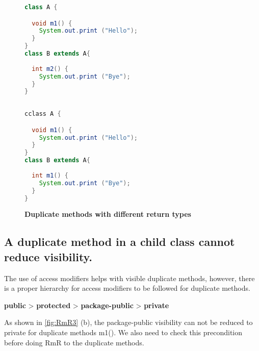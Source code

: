 \begin{figure}[th]
\centering
\begin{minipage}[t]{0.7\linewidth}
\begin{lstlisting}[language=java, basicstyle=\scriptsize\ttfamily,frame=single]
class A {

  void m1() {
    System.out.print ("Hello");
  }
}
class B extends A{
 
  int m2() {
    System.out.print ("Bye");
  }	
}
 
\end{lstlisting}
\end{minipage}
\hfill
\begin{minipage}[t]{0.7\linewidth}
\begin{lstlisting}[language=java, basicstyle=\scriptsize\ttfamily,frame=single]
cclass A {

  void m1() {
    System.out.print ("Hello");
  }
}
class B extends A{
 
  int m1() {
    System.out.print ("Bye");
  }	
}

\end{lstlisting}
\end{minipage}
\caption{\textbf{Duplicate methods with different return types}}
\label{fig:RmR2}
\end{figure}

\subsection{A duplicate method in a child class cannot reduce visibility.}

The use of access modifiers helps with visible duplicate methods, however, there is a proper hierarchy for access modifiers to be followed for duplicate methods.

\textbf{public} > \textbf{protected} > \textbf{package-public} > \textbf{private}

As shown in \ref{fig:RmR3} (b), the package-public visibility can not be reduced to private for duplicate methods m1(). We also need to check this precondition before doing RmR to the duplicate methods.

